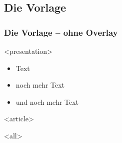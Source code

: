 \subsection{Die Vorlage}
{%
\begin{frame}[fragile,t]
\frametitle<presentation>{Die Vorlage -- ohne Overlay}



\mode
<presentation>

\begin{itemize}
 \item Text
 \item noch mehr Text
 \item und noch mehr Text
\end{itemize}


\mode
<article>

\mode
<all>


\end{frame}
}

\newpage
